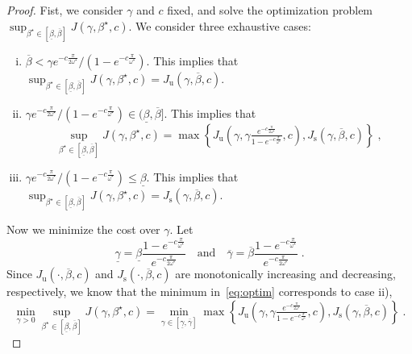 \documentclass{article}
\newcommand{\rs}{\mathrm{s}}
\newcommand{\ru}{\mathrm{u}}
\theoremstyle{definition}
\theoremstyle{remark}
\begin{document}
\begin{proof}
    Fist, we consider $\gamma$ and $c$ fixed, and solve the optimization problem $\sup_{\beta^\star \in [\underline{\beta}, \overline{\beta}]} J(\gamma,\beta^\star,c)$. We consider three exhaustive cases:
    \begin{enumerate}[i)]
        \item $\overline{\beta} < \gamma e^{-c\frac{\pi}{2\omega^\star}}/(1 - e^{-c\frac{\pi}{\omega^\star}})$. This implies that $\sup_{\beta^\star \in [\underline{\beta}, \overline{\beta}]} J(\gamma,\beta^\star,c) = J_\ru(\gamma,\overline{\beta},c)$.
        \item $\gamma e^{-c\frac{\pi}{2\omega^\star}}/(1 - e^{-c\frac{\pi}{\omega^\star}}) \in (\underline{\beta}, \overline{\beta}]$. This implies that
        \begin{displaymath}
            \sup_{\beta^\star \in [\underline{\beta}, \overline{\beta}]} J(\gamma,\beta^\star,c) = \max\left\{J_\ru\left(\gamma,\gamma\tfrac{e^{-c\frac{\pi}{2\omega^\star}}}{1 - e^{-c\frac{\pi}{\omega^\star}}},c\right), J_\rs(\gamma,\overline{\beta},c)\right\} \;,
        \end{displaymath}
        \item $\gamma e^{-c\frac{\pi}{2\omega^\star}}/(1 - e^{-c\frac{\pi}{\omega^\star}}) \le \underline{\beta}$. This implies that $\sup_{\beta^\star \in [\underline{\beta}, \overline{\beta}]} J(\gamma,\beta^\star,c) = J_\rs(\gamma,\overline{\beta},c)$.
    \end{enumerate}
    Now we minimize the cost over $\gamma$. Let
    \begin{displaymath}
        \underline{\gamma} = \underline{\beta}\frac{1 - e^{-c\frac{\pi}{\omega^\star}}}{e^{-c\frac{\pi}{2\omega^\star}}} \quad \text{and} \quad
        \overline{\gamma} = \overline{\beta}\frac{1 - e^{-c\frac{\pi}{\omega^\star}}}{e^{-c\frac{\pi}{2\omega^\star}}} \;.
    \end{displaymath}
    Since $J_\ru\left(\cdot,\overline{\beta},c\right)$ and $J_\rs\left(\cdot,\overline{\beta},c\right)$ are monotonically increasing and decreasing, respectively, we know that the minimum in~\eqref{eq:optim} corresponds to case ii),
    \begin{displaymath}
        \min_{\gamma > 0} \sup_{\beta^\star \in [\underline{\beta}, \overline{\beta}]} J(\gamma,\beta^\star,c) = \min_{\gamma \in [\underline{\gamma}, \overline{\gamma}]}\max\left\{J_\ru\left(\gamma,\gamma\tfrac{e^{-c\frac{\pi}{2\omega^\star}}}{1 - e^{-c\frac{\pi}{\omega^\star}}},c\right), J_\rs(\gamma,\overline{\beta},c)\right\} \;.

\end{displaymath}
\end{proof}
\end{document}
